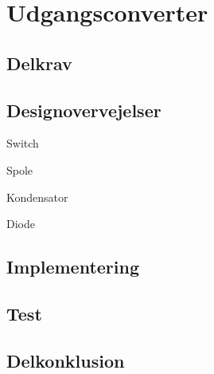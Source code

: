 \documentclass[../main.tex]{subfiles}
\begin{document}
            
                    
\section{Udgangsconverter}
        
    \subsection{Delkrav}
        
    \subsection{Designovervejelser}
            
            Switch

            Spole

            Kondensator

            Diode


            
    \subsection{Implementering}
        
    \subsection{Test}
        
    \subsection{Delkonklusion}
        
        
\end{document}
